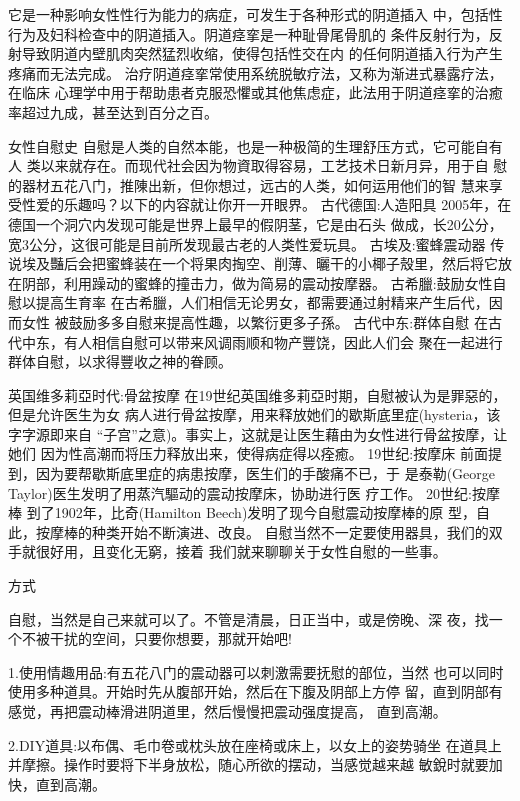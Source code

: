 \documentclass[12pt,UTF8]{ctexbook}
\begin{document}
它是一种影响女性性行为能力的病症，可发生于各种形式的阴道插入
中，包括性行为及妇科检查中的阴道插入。阴道痉挛是一种耻骨尾骨肌的
条件反射行为，反射导致阴道内壁肌肉突然猛烈收缩，使得包括性交在内
的任何阴道插入行为产生疼痛而无法完成。
治疗阴道痉挛常使用系统脱敏疗法，又称为渐进式暴露疗法，在临床
心理学中用于帮助患者克服恐懼或其他焦虑症，此法用于阴道痉挛的治癒
率超过九成，甚至达到百分之百。

女性自慰史
自慰是人类的自然本能，也是一种极简的生理舒压方式，它可能自有人
类以来就存在。而现代社会因为物資取得容易，工艺技术日新月异，用于自
慰的器材五花八门，推陳出新，但你想过，远古的人类，如何运用他们的智
慧来享受性爱的乐趣吗？以下的内容就让你开一开眼界。
古代德国:人造阳具
2005年，在德国一个洞穴内发现可能是世界上最早的假阴茎，它是由石头
做成，长20公分，宽3公分，这很可能是目前所发现最古老的人类性爱玩具。
古埃及:蜜蜂震动器
传说埃及豔后会把蜜蜂装在一个将果肉掏空、削薄、曬干的小椰子殼里，然后将它放在阴部，利用躁动的蜜蜂的撞击力，做为简易的震动按摩器。
古希臘:鼓励女性自慰以提高生育率
在古希臘，人们相信无论男女，都需要通过射精来产生后代，因而女性
被鼓励多多自慰来提高性趣，以繁衍更多子孫。
古代中东:群体自慰
在古代中东，有人相信自慰可以带来风调雨顺和物产豐饶，因此人们会
聚在一起进行群体自慰，以求得豐收之神的眷顾。

英国维多莉亞时代:骨盆按摩
在19世纪英国维多莉亞时期，自慰被认为是罪惡的，但是允许医生为女
病人进行骨盆按摩，用来释放她们的歇斯底里症(hysteria，该字字源即来自
“子宫”之意)。事实上，这就是让医生藉由为女性进行骨盆按摩，让她们
因为性高潮而将压力释放出来，使得病症得以痊癒。
19世纪:按摩床
前面提到，因为要帮歇斯底里症的病患按摩，医生们的手酸痛不已，于
是泰勒(George Taylor)医生发明了用蒸汽驅动的震动按摩床，协助进行医
疗工作。
20世纪:按摩棒
到了1902年，比奇(Hamilton Beech)发明了现今自慰震动按摩棒的原
型，自此，按摩棒的种类开始不断演进、改良。
自慰当然不一定要使用器具，我们的双手就很好用，且变化无窮，接着
我们就来聊聊关于女性自慰的一些事。

方式

自慰，当然是自己来就可以了。不管是清晨，日正当中，或是傍晚、深
夜，找一个不被干扰的空间，只要你想要，那就开始吧!

1.使用情趣用品:有五花八门的震动器可以刺激需要抚慰的部位，当然
也可以同时使用多种道具。开始时先从腹部开始，然后在下腹及阴部上方停
留，直到阴部有感觉，再把震动棒滑进阴道里，然后慢慢把震动强度提高，
直到高潮。

2.DIY道具:以布偶、毛巾卷或枕头放在座椅或床上，以女上的姿势骑坐
在道具上并摩擦。操作时要将下半身放松，随心所欲的摆动，当感觉越来越
敏銳时就要加快，直到高潮。
\end{document}

